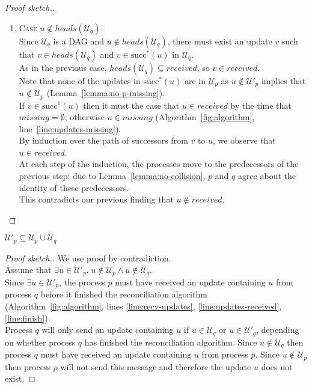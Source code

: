 \documentclass[a4paper,anonymous,USenglish]{lipics-v2019}
\begin{document}
\begin{proof}[Proof sketch.]
\begin{enumerate}
    \item\textsc{Case} $u \notin \mathit{heads}(\mathcal{U}_q)$:\\
    Since $\mathcal{U}_q$ is a DAG and $u \notin \mathit{heads}(\mathcal{U}_q)$, there must exist an update $v$ such that $v \in \mathit{heads}(\mathcal{U}_q)$ and $v \in \mathrm{succ}^*(u)$ in $\mathcal{U}_q$.\\
    As in the previous case, $\mathit{heads}(\mathcal{U}_q) \subseteq \mathit{received}$, so $v \in \mathit{received}$.\\
    Note that none of the updates in $\mathrm{succ}^*(u)$ are in $\mathcal{U}_p$ as $u \notin \mathcal{U}'_p$ implies that  $u \notin \mathcal{U}_p$ (Lemma~\ref{lemma:no-p-missing}).\\
    If $v \in \mathrm{succ}^1(u)$ then it must the case that $u \in \mathit{received}$ by the time that $\mathit{missing} = \emptyset$, otherwise $u \in \mathit{missing}$ (Algorithm~\ref{fig:algorithm}, line~\ref{line:updates-missing}).\\
    By induction over the path of successors from $v$ to $u$, we observe that $u \in \mathit{received}$.\\
    At each step of the induction, the processes move to the predecessors of the previous step; due to Lemma~\ref{lemma:no-collision}, $p$ and $q$ agree about the identity of these predecessors.\\
    This contradicts our previous finding that $u \notin \mathit{received}$.
\end{enumerate}
\end{proof}

\begin{lemma}\label{lemma:no-extras}
$\mathcal{U}'_p \subseteq \mathcal{U}_p \cup \mathcal{U}_q$    
\end{lemma}
\begin{proof}[Proof sketch.]
We use proof by contradiction.\\
Assume that $\exists u \in \mathcal{U}'_p.\; u \notin \mathcal{U}_p  \land  u \notin \mathcal{U}_q$.\\
Since $\exists u \in \mathcal{U}'_p$, the process $p$ must have received an update containing $u$ from process $q$ before it finished the reconciliation algorithm (Algorithm~\ref{fig:algorithm}, lines \ref{line:recv-updates}, \ref{line:updates-received}, \ref{line:finish}).\\
Process $q$ will only send an update containing $u$ if $u \in \mathcal{U}_q$ or $u \in \mathcal{U}'_q$, depending on whether process $q$ has finished the reconciliation algorithm.
Since $u \notin \mathcal{U}_q$ then process $q$ must have received an update containing $u$ from process $p$.
Since $u \notin \mathcal{U}_p$ then process $p$ will not send this message and therefore the update $u$ does not exist.
\end{proof}
\end{document}
